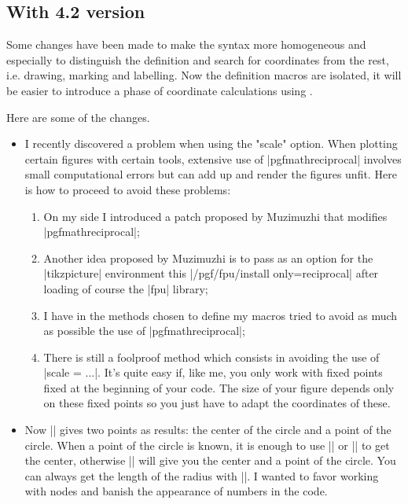 \subsection{With 4.2 version} %
\label{sub:with_4_2_version}

Some changes have been made to make the syntax more homogeneous and especially to distinguish the definition and search for coordinates from the rest, i.e. drawing, marking and labelling.
Now the definition macros are isolated, it will be easier to introduce a phase of coordinate calculations using .

Here are some of the changes. 
\vspace{1cm}
 \begin{itemize}\setlength{\itemsep}{10pt} 
  

\item I recently discovered a problem when using the "scale" option. When plotting certain figures with certain tools, extensive use of |pgfmathreciprocal| involves small computational errors but can add up and render the figures unfit. Here is how to proceed to avoid these problems:
\begin{enumerate}
  
  \item On my side I introduced a patch proposed by Muzimuzhi that modifies 
|pgfmathreciprocal|;

\item  Another idea proposed by Muzimuzhi is to pass as an option for the |tikzpicture| environment this |/pgf/fpu/install only={reciprocal}| after loading of course the |fpu| library;

\item I have in the methods chosen to define my macros tried to avoid as much as possible the use of |pgfmathreciprocal|;

\item  There is still a foolproof method which consists in avoiding the use of |scale = ...|. It's quite easy if, like me, you only work with fixed points fixed at the beginning of your code. The size of your figure depends only on these fixed points so you just have to adapt the coordinates of these.
\end{enumerate}

\item Now |\tkzDefCircle| gives two points as results: the center of the circle and a point of the circle. When a point of the circle is known, it is enough to use |\tkzGetPoint| or |\tkzGetFirstPoint|
to get the center, otherwise |\tkzGetPoints| will give you the center and a point of the circle. You can always get the length of the radius with |\tkzGetLength|. I wanted to favor working with nodes and banish the appearance of numbers in the code.


\end{itemize}
